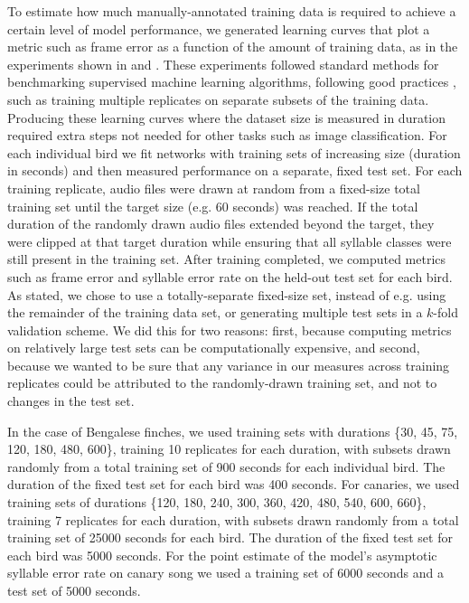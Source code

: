 \documentclass[9pt,lineno]{elife}
\begin{document}
To estimate how much manually-annotated training data is required to achieve a certain level of model performance,  
we generated learning curves that plot a metric such as frame error as a function of the amount of training data, 
as in the experiments shown in  and . 
These experiments followed standard methods for benchmarking supervised machine learning algorithms, 
following good practices \citep{james2013introduction}, 
such as training multiple replicates on separate subsets of the training data. 
Producing these learning curves where the dataset size is measured in duration 
required extra steps not needed for other tasks such as image classification.
For each individual bird we fit networks with training sets of increasing size (duration in seconds) 
and then measured performance on a separate, fixed test set.
For each training replicate, audio files were drawn at random from a fixed-size total training set  
until the target size (e.g. 60 seconds) was reached. If the total duration of the randomly drawn audio files 
extended beyond the target, they were clipped at that target duration 
while ensuring that all syllable classes were still present in the training set. 
After training completed, 
we computed metrics such as frame error and syllable error rate on the held-out test set for each bird.
As stated, we chose to use a totally-separate fixed-size set, 
instead of e.g. using the remainder of the training data set, 
or generating multiple test sets in a $k$-fold validation scheme. 
We did this for two reasons: 
first, because computing metrics on relatively large test sets can be computationally expensive, 
and second, because we wanted to be sure that any variance in our measures 
across training replicates could be attributed to 
the randomly-drawn training set, and not to changes in the test set.

In the case of Bengalese finches, we used training sets with durations \{30, 45, 75, 120, 180, 480, 600\}, 
training 10 replicates for each duration, with subsets drawn randomly 
from a total training set of 900 seconds for each individual bird.
The duration of the fixed test set for each bird was 400 seconds.
For canaries, we used training sets of durations \{120, 180, 240, 300, 360, 420, 480, 540, 600, 660\}, 
training 7 replicates for each duration, with subsets drawn randomly 
from a total training set of 25000 seconds for each bird.
The duration of the fixed test set for each bird was 5000 seconds.
For the point estimate of the model's asymptotic syllable error rate 
on canary song we used a training set of 6000 seconds and a test set of 5000 seconds. 
\end{document}
